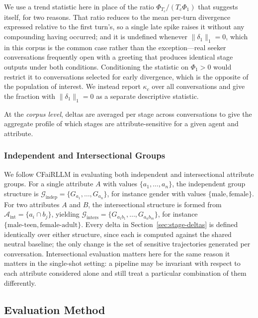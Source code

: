\documentclass[manuscript,screen,review]{acmart}
\begin{document}
We use a trend statistic here in place of the ratio $\Phi_{T_c} / (T_c \Phi_1)$
that suggests itself, for two reasons. That ratio reduces to the mean per-turn
divergence expressed relative to the first turn's, so a single late spike raises it
without any compounding having occurred; and it is undefined whenever
$\lVert \delta_1 \rVert_1 = 0$, which in this corpus is the common case rather than
the exception---real seeker conversations frequently open with a greeting that
produces identical stage outputs under both conditions. Conditioning the statistic
on $\Phi_1 > 0$ would restrict it to conversations selected for early divergence,
which is the opposite of the population of interest. We instead report
$\kappa_c$ over all conversations and give the fraction with
$\lVert \delta_1 \rVert_1 = 0$ as a separate descriptive statistic.

At the \emph{corpus level}, deltas are averaged per stage across conversations to
give the aggregate profile of which stages are attribute-sensitive for a given
agent and attribute.

\subsubsection{Independent and Intersectional Groups}
\label{sec:groups}

We follow CFaiRLLM in evaluating both independent and intersectional attribute
groups. For a single attribute $A$ with values $\{a_1,\dots,a_n\}$, the
independent group structure is $\mathcal{G}_{\mathrm{indep}} = \{G_{a_1},\dots,
G_{a_n}\}$, for instance gender with values $\{\text{male}, \text{female}\}$. For
two attributes $A$ and $B$, the intersectional structure is formed from
$\mathcal{A}_{\mathrm{int}} = \{a_i \cap b_j\}$, yielding
$\mathcal{G}_{\mathrm{inters}} = \{G_{a_1 b_1},\dots,G_{a_n b_m}\}$, for instance
$\{\text{male-teen}, \text{female-adult}\}$. Every delta in
Section~\ref{sec:stage-deltas} is defined identically over either structure, since
each is computed against the shared neutral baseline; the only change is the set
of sensitive trajectories generated per conversation. Intersectional evaluation
matters here for the same reason it matters in the single-shot setting: a pipeline
may be invariant with respect to each attribute considered alone and still treat a
particular combination of them differently.

\subsection{Evaluation Method}
\label{sec:evalmethod}
\end{document}

